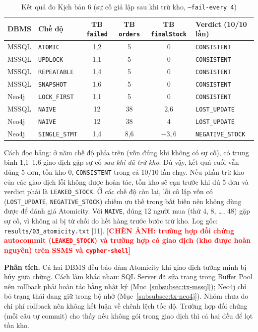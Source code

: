 \begin{table}[htbp]
\centering
\caption{Kết quả đo Kịch bản 6 (sự cố giả lập sau khi trừ kho, \texttt{--fail-every 4})}
\label{tab:tx-kb6}
\renewcommand{\arraystretch}{1.2}
\begin{tabularx}{\textwidth}{l l c c c X}
\toprule
\textbf{DBMS} & \textbf{Chế độ} & \textbf{TB \texttt{failed}} & \textbf{TB \texttt{orders}} & \textbf{TB \texttt{finalStock}} & \textbf{Verdict (10/10 lần)} \\
\midrule
MSSQL & \texttt{ATOMIC} & 1,2 & 5 & 0 & \texttt{CONSISTENT} \\
MSSQL & \texttt{UPDLOCK} & 1,1 & 5 & 0 & \texttt{CONSISTENT} \\
MSSQL & \texttt{REPEATABLE} & 1,4 & 5 & 0 & \texttt{CONSISTENT} \\
MSSQL & \texttt{SNAPSHOT} & 1,6 & 5 & 0 & \texttt{CONSISTENT} \\
Neo4j & \texttt{LOCK\_FIRST} & 1,1 & 5 & 0 & \texttt{CONSISTENT} \\
\midrule
MSSQL & \texttt{NAIVE} & 12 & 38 & 2,6 & \texttt{LOST\_UPDATE} \\
Neo4j & \texttt{NAIVE} & 12 & 38 & 4 & \texttt{LOST\_UPDATE} \\
Neo4j & \texttt{SINGLE\_STMT} & 1,4 & 8,6 & $-3{,}6$ & \texttt{NEGATIVE\_STOCK} \\
\bottomrule
\end{tabularx}
\end{table}

Cách đọc bảng: ở năm chế độ phía trên (vốn đúng khi không có sự cố), có trung bình 1,1--1,6 giao dịch gặp sự cố \emph{sau khi đã trừ kho}. Dù vậy, kết quả cuối vẫn đúng 5 đơn, tồn kho 0, \texttt{CONSISTENT} trong cả 10/10 lần chạy. Nếu phần trừ kho của các giao dịch lỗi không được hoàn tác, tồn kho sẽ cạn trước khi đủ 5 đơn và verdict phải là \texttt{LEAKED\_STOCK}. Ở các chế độ còn lại, lỗi cô lập vốn có (\texttt{LOST\_UPDATE}, \texttt{NEGATIVE\_STOCK}) chiếm ưu thế trong bất biến nên không dùng được để đánh giá Atomicity. Với \texttt{NAIVE}, đúng 12 người mua (thứ 4, 8, \ldots, 48) gặp sự cố, vì không ai bị từ chối do hết hàng trước bước trừ kho. Log gốc: \texttt{results/03\_atomicity.txt} [11]. \textcolor{red}{\textbf{[CHÈN ẢNH: trường hợp đối chứng autocommit (\texttt{LEAKED\_STOCK}) và trường hợp có giao dịch (kho được hoàn nguyên) trên SSMS và \texttt{cypher-shell}]}}

\textbf{Phân tích.} Cả hai DBMS đều bảo đảm Atomicity khi giao dịch tường minh bị hủy giữa chừng. Cách làm khác nhau: SQL Server đã sửa trang trong Buffer Pool nên rollback phải hoàn tác bằng nhật ký (Mục~\ref{subsubsec:tx-mssql}); Neo4j chỉ bỏ trạng thái đang giữ trong bộ nhớ (Mục~\ref{subsubsec:tx-neo4j}). Nhóm chưa đo chi phí rollback nên không kết luận về chênh lệch tốc độ. Trường hợp đối chứng (mỗi câu tự commit) cho thấy nếu không gói trong giao dịch thì cả hai đều để lọt tồn kho.

